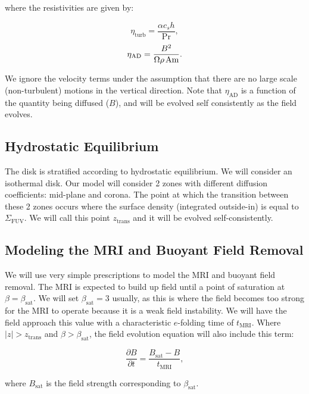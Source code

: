 \noindent where the resistivities are given by:

\begin{equation}
\eta_{\text{turb}} = \frac{\alpha c_s h}{\text{Pr}},
\end{equation}
\begin{equation}
\eta_{\text{AD}}   = \frac{B^2}{\Omega \rho \hspace{0.5mm} \text{Am}}.                   
\end{equation}

\noindent We ignore the velocity terms under the assumption that there are no large scale (non-turbulent) motions in the vertical direction.  Note that $\eta_{\text{AD}}$ is a function of the quantity being diffused ($B$), and will be evolved self consistently as the field evolves.  


\subsection{Hydrostatic Equilibrium}
The disk is stratified according to hydrostatic equilibrium.  We will consider an isothermal disk.  Our model will consider 2 zones with different diffusion coefficients: mid-plane and corona.  The point at which the transition between these 2 zones occurs where the surface density (integrated outside-in) is equal to $\Sigma_\text{FUV}$.  We will call this point $z_\text{trans}$ and it will be evolved self-consistently.  


\subsection{Modeling the MRI and Buoyant Field Removal}
We will use very simple prescriptions to model the MRI and buoyant field removal.  The MRI is expected to build up field until a point of saturation at $\beta=\beta_\text{sat}$.  We will set $\beta_\text{sat}=3$ usually, as this is where the field becomes too strong for the MRI to operate because it is a weak field instability.  We will have the field approach this value with a characteristic $e$-folding time of $t_{\text{MRI}}$.  Where $|z|>z_{\text{trans}}$ and $\beta>\beta_{\text{sat}}$, the field evolution equation will also include this term:

\begin{equation}
\frac{\partial B}{\partial t} = \frac{B_{\text{sat}}-B}{t_\text{MRI}}, 
\end{equation}

\noindent where $B_{\text{sat}}$ is the field strength corresponding to $\beta_{\text{sat}}$.  

